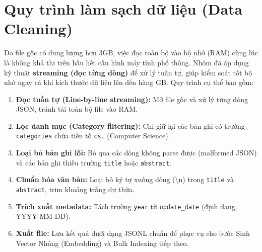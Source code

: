 \section{Quy trình làm sạch dữ liệu (Data Cleaning)}
Do file gốc có dung lượng hơn 3GB, việc đọc toàn bộ vào bộ nhớ (RAM) cùng lúc là không khả thi trên hầu hết cấu hình máy tính phổ thông. Nhóm đã áp dụng kỹ thuật \textbf{streaming (đọc từng dòng)} để xử lý tuần tự, giúp kiểm soát tốt bộ nhớ ngay cả khi kích thước dữ liệu lên đến hàng GB. Quy trình cụ thể bao gồm:
\begin{enumerate}
    \item \textbf{Đọc tuần tự (Line-by-line streaming):} Mở file gốc và xử lý từng dòng JSON, tránh tải toàn bộ file vào RAM.
    \item \textbf{Lọc danh mục (Category filtering):} Chỉ giữ lại các bản ghi có trường \texttt{categories} chứa tiền tố \texttt{cs.} (Computer Science).
    \item \textbf{Loại bỏ bản ghi lỗi:} Bỏ qua các dòng không parse được (malformed JSON) và các bản ghi thiếu trường \texttt{title} hoặc \texttt{abstract}.
    \item \textbf{Chuẩn hóa văn bản:} Loại bỏ ký tự xuống dòng (\textbackslash n) trong \texttt{title} và \texttt{abstract}, trim khoảng trắng dư thừa.
    \item \textbf{Trích xuất metadata:} Tách trường \texttt{year} từ \texttt{update\_date} (định dạng YYYY-MM-DD).
    \item \textbf{Xuất file:} Lưu kết quả dưới dạng JSONL chuẩn để phục vụ cho bước Sinh Vector Nhúng (Embedding) và Bulk Indexing tiếp theo.
\end{enumerate}